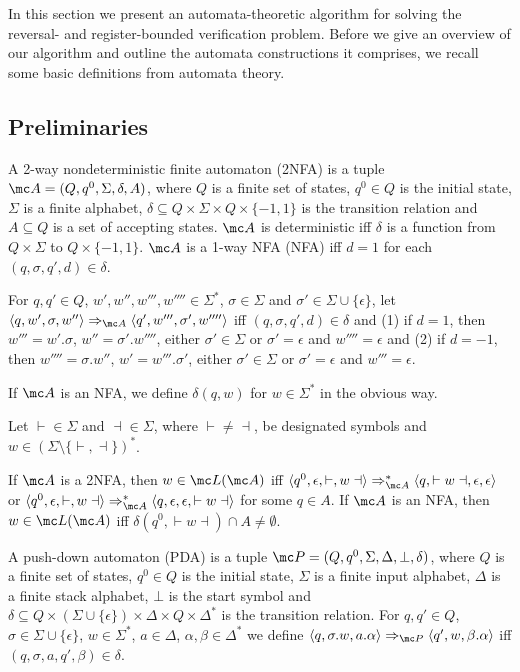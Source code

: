 In this section we present an automata-theoretic algorithm for solving the reversal- and register-bounded verification problem. Before we give an overview of our algorithm and outline the automata constructions it comprises, we recall some basic definitions from automata theory.

\subsection{Preliminaries}
 A 2-way nondeterministic finite automaton (2NFA) is a tuple
$\mc A = (Q,q^0,\Sigma,\delta,A)$, where 
$Q$ is a finite set of states,
$q^0 \in Q$ is the initial state,
$\Sigma$ is a finite alphabet,
$\delta \subseteq Q \times \Sigma \times  Q \times \{-1,1\}$ is the transition relation and 
$A \subseteq Q$ is a set of accepting states.
$\mc A$ is deterministic iff $\delta$ is a function from $Q \times \Sigma$ to $Q \times \{-1,1\}$.
$\mc A$ is a 1-way NFA (NFA) iff $d = 1$ for each $(q,\sigma,q',d) \in \delta$. 

For $q,q' \in Q$, $w',w'',w''',w'''' \in \Sigma^*$, $\sigma \in \Sigma$ and $\sigma' \in \Sigma \cup \{\epsilon\}$, let $\langle q,w',\sigma,w''\rangle \Rightarrow_{\mc A} \langle q',w''',\sigma',w''''\rangle$ iff $(q,\sigma,q',d) \in \delta$ and
(1) if $d = 1$, then $w''' = w'.\sigma$, $w'' =\sigma'.w''''$, either $\sigma' \in \Sigma$ or $\sigma' = \epsilon$ and $w'''' =\epsilon$ and 
(2) if $d = -1$, then $w'''' = \sigma . w''$, $w' =w'''.\sigma'$, either $\sigma' \in \Sigma$ or $\sigma' = \epsilon$ and $w''' =\epsilon$.
 
   
If $\mc A$ is an NFA, we define $\delta(q,w)$ for $w \in \Sigma^*$ in the obvious way.


Let $\vdash \in \Sigma$ and $\dashv \in \Sigma$, where $\vdash \neq \dashv$, be designated symbols and $w \in (\Sigma \setminus \{\vdash,\dashv\})^*$.

If $\mc A$ is a 2NFA, then $w \in \mc L(\mc A)$ iff
$\langle q^0,\epsilon,\vdash, w \dashv \rangle \Rightarrow_{\mc A}^* \langle q,\vdash w \dashv,\epsilon,\epsilon \rangle$ or 
$\langle q^0,\epsilon,\vdash, w \dashv \rangle \Rightarrow_{\mc A}^* \langle q,\epsilon,\epsilon,\vdash w \dashv \rangle$ for some $q \in A$.
If $\mc A$ is an NFA, then $w \in \mc L(\mc A)$ iff $\delta(q^0,\vdash w \dashv) \cap A \neq \emptyset$.

A push-down automaton (PDA) is a tuple $\mc P = (Q,q^0,\Sigma,\Delta,\bot,\delta)$, where
$Q$ is a finite set of states,
$q^0 \in Q$ is the initial state,
$\Sigma$ is a finite input alphabet,
$\Delta$ is a finite stack alphabet,
$\bot$ is the start symbol and
$\delta \subseteq Q \times (\Sigma \cup \{\epsilon\}) \times \Delta \times Q \times \Delta^*$ is the transition relation. For $q,q' \in Q$, $\sigma \in \Sigma \cup \{\epsilon\}$, $w \in \Sigma^*$, $a \in \Delta$, $\alpha,\beta \in \Delta^*$ we define 
$\langle q, \sigma.w,a.\alpha\rangle \Rightarrow_{\mc P} \langle q', w,\beta.\alpha\rangle$ iff
$(q,\sigma,a,q',\beta) \in \delta$.

